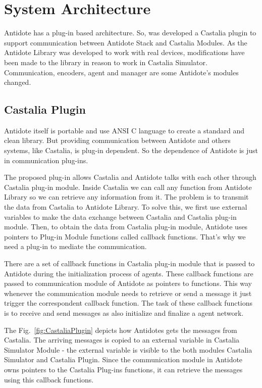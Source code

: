 \section{System Architecture}\label{systemarch}

Antidote has a plug-in based architecture. So, was developed a Castalia plugin to support communication between Antidote Stack and Castalia Modules. As the Antidote Library was developed to work with real devices, modifications have been made to the library in reason to work in Castalia Simulator. Communication, encoders, agent and manager are some Antidote's modules changed.

\subsection{Castalia Plugin}

Antidote itself is portable and use ANSI C language to create a standard and clean library. But providing communication between Antidote and others systems, like Castalia, is plug-in dependent. So the dependence of Antidote is just in communication plug-ins.

The proposed plug-in allows Castalia and Antidote talks with each other through Castalia plug-in module. Inside Castalia we can call any function from Antidote Library so we can retrieve any information from it. The problem is to transmit the data from Castalia to Antidote Library. To solve this, we first use external variables to make the data exchange between Castalia and Castalia plug-in module. Then, to obtain the data from Castalia plug-in module, Antidote uses pointers to Plug-in Module functions called callback functions. That's why we need a plug-in to mediate the communication. 

There are a set of callback functions in Castalia plug-in module that is passed to Antidote during the initialization process of agents. These callback functions are passed to communication module of Antidote as pointers to functions. This way whenever the communication module needs to retrieve or send a message it just trigger the correspondent callback function. The task of these callback functions is to receive and send messages as also initialize and finalize a agent network.

The Fig.~\ref{fig:CastaliaPlugin} depicts how Antidotes gets the messages from Castalia. The arriving messages is copied to an external variable in Castalia Simulator Module - the external variable is visible to the both modules Castalia Simulator and Castalia Plugin. Since the communication module in Antidote owns pointers to the Castalia Plug-ins functions, it can retrieve the messages using this callback functions.

